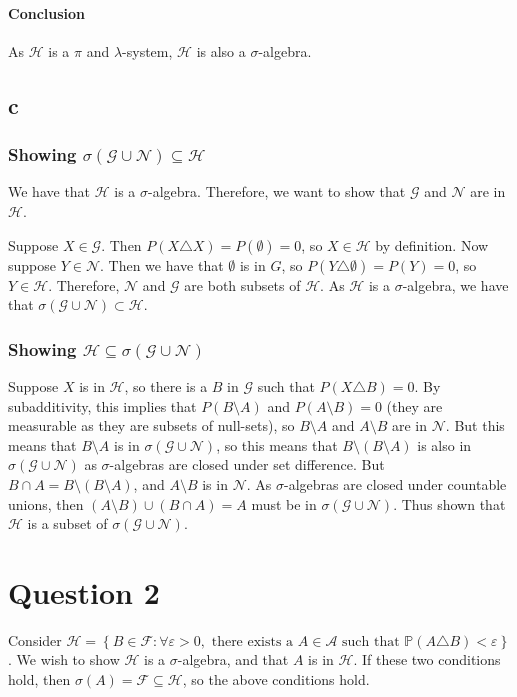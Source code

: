 \documentclass{article}
\theoremstyle{definition}
\numberwithin{theorem}{section}
\numberwithin{equation}{section}
\begin{document}
\paragraph{Conclusion}
As $\mathcal{H}$ is a $\pi$ and $\lambda$-system, $\mathcal{H}$ is also a $\sigma$-algebra. 

\subsection{c}
\subsubsection{Showing $ \sigma(\mathcal{G} \cup \mathcal{N}) \subseteq \mathcal{H}$}
We have that $\mathcal{H}$ is a $\sigma$-algebra. Therefore, we want to show that $\mathcal{G}$ and $\mathcal{N}$ are in $\mathcal{H}$. 

Suppose $X \in \mathcal{G}$. Then $P(X \triangle X) = P(\emptyset) = 0$, so $X \in \mathcal{H}$ by definition. Now suppose $Y \in \mathcal{N}$. Then we have that $\emptyset$ is in $G$, so $P(Y \triangle \emptyset)  = P(Y) = 0$, so $Y \in \mathcal{H}$. Therefore, $\mathcal{N}$ and $\mathcal{G}$ are both subsets of $\mathcal{H}$. As $\mathcal{H}$ is a $\sigma$-algebra, we have that $ \sigma(\mathcal{G} \cup \mathcal{N}) \subset \mathcal{H}$. 

\subsubsection{Showing $\mathcal{H} \subseteq \sigma(\mathcal{G} \cup \mathcal{N})$}
Suppose $X$ is in $\mathcal{H}$, so there is a $B$ in $\mathcal{G}$ such that $P(X \triangle B) = 0$. By subadditivity, this implies that $P(B \setminus A)$ and $P(A \setminus B) = 0$ (they are measurable as they are subsets of null-sets), so $B \setminus A$ and $A \setminus B$ are in $\mathcal{N}$. But this means that $B \setminus A$ is in $\sigma(\mathcal{G} \cup \mathcal{N})$, so this means that $B \setminus (B \setminus A)$ is also in $\sigma(\mathcal{G} \cup \mathcal{N})$ as $\sigma$-algebras are closed under set difference. But $B \cap A = B \setminus (B \setminus A)$, and $A \setminus B$ is in $\mathcal{N}$. As $\sigma$-algebras are closed under countable unions, then $(A \setminus B) \cup (B \cap A) = A$ must be in $\sigma(\mathcal{G} \cup \mathcal{N})$. Thus shown that $\mathcal{H}$ is a subset of $\sigma(\mathcal{G} \cup \mathcal{N})$. 


\section{Question 2}
Consider $\mathcal{H} = \left\{ B \in \mathcal{F}: \forall \varepsilon > 0, \text{ there exists a } A \in \mathcal{A} \text{ such that } \mathbb{P}(A \triangle B) < \varepsilon \right\}$. We wish to show $\mathcal{H}$ is a $\sigma$-algebra, and that $A$ is in $\mathcal{H}$. If these two conditions hold, then $\sigma(A) = \mathcal{F} \subseteq \mathcal{H}$, so the above conditions hold. 
\end{document}
